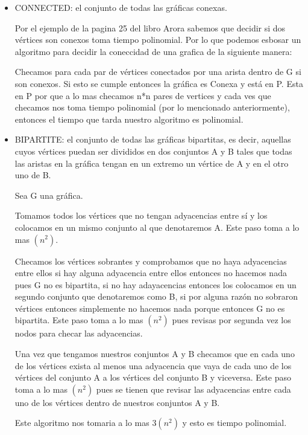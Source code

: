 \documentclass[12pt]{article}
\begin{document}
 \begin{itemize}
  \item CONNECTED: el conjunto de todas las gráficas conexas.
  
    Por el ejemplo de la pagina 25 del libro Arora sabemos que decidir si dos vértices son conexos toma tiempo polinomial. Por lo que podemos esbosar un algoritmo para decidir la coneccidad de una grafica de la siguiente manera:

    Checamos para cada par de vértices conectados por una arista dentro de G si son conexos. Si esto se cumple entonces la gráfica es Conexa y está en P. Esta en P por que a lo mas checamos n*n pares de vertices y cada ves que checamos
      nos toma tiempo polinomial (por lo mencionado anteriormente), entonces el tiempo que tarda nuestro algoritmo es polinomial.
    
  
  \item BIPARTITE: el conjunto de todas las gráficas bipartitas, es decir, aquellas cuyos vértices puedan ser divididos en dos conjuntos A y B tales que todas las aristas en la gráfica tengan en un extremo un vértice de A y en el otro uno de B. 
  
  Sea G una gráfica.
  
  Tomamos todos los vértices que no tengan adyacencias entre sí y los colocamos en un mismo conjunto al que denotaremos A. Este paso toma a lo mas $(n^2)$.
  
  Checamos los vértices sobrantes y comprobamos que no haya adyacencias entre ellos si hay alguna adyacencia entre ellos entonces no hacemos nada pues G no es bipartita, si no hay adayacencias entonces los colocamos en un segundo conjunto que denotaremos como B, si por alguna razón no sobraron vértices entonces simplemente no hacemos nada porque entonces G no es bipartita.
Este paso toma a lo mas $(n^2)$ pues revisas por segunda vez los nodos para checar las adyacencias.

  Una vez que tengamos nuestros conjuntos A y B checamos que en cada uno de los vértices exista al menos una adyacencia que vaya de cada uno de los vértices del conjunto A a los vértices del conjunto B y viceversa.
	Este paso toma a lo mas $(n^2)$ pues se tienen que revisar las adyacencias    	entre cada uno de los vértices dentro de nuestros conjuntos A y B. 
	
  Este algoritmo nos tomaria a lo mas $3(n^2)$ y esto es tiempo polinomial.
  
 \end{itemize}
\end{document}
